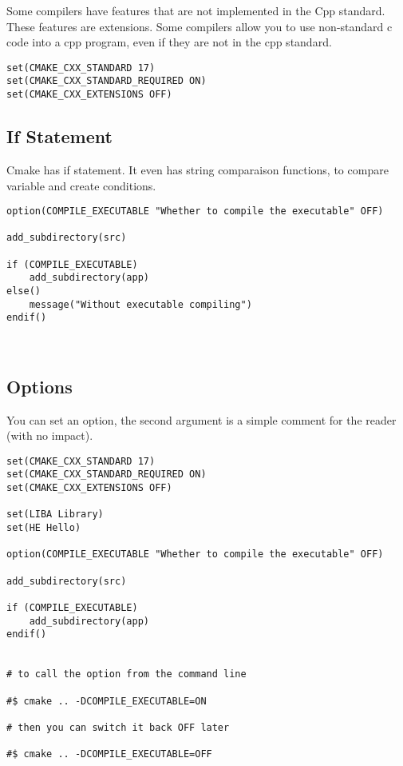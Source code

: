 Some compilers have features that are not implemented in the Cpp standard. These features are extensions.
Some compilers allow you to use non-standard c code into a cpp program, even if they are not in the cpp standard.

\begin{verbatim}
set(CMAKE_CXX_STANDARD 17)
set(CMAKE_CXX_STANDARD_REQUIRED ON)
set(CMAKE_CXX_EXTENSIONS OFF)
\end{verbatim}

\subsection{If Statement}

Cmake has if statement. It even has string comparaison functions, to compare variable and create conditions.

\begin{verbatim}
option(COMPILE_EXECUTABLE "Whether to compile the executable" OFF)

add_subdirectory(src)

if (COMPILE_EXECUTABLE)
    add_subdirectory(app)
else()
    message("Without executable compiling")
endif()



\end{verbatim}


\subsection{Options}

You can set an option, the second argument is a simple comment for the reader (with no impact).

\begin{verbatim}
set(CMAKE_CXX_STANDARD 17)
set(CMAKE_CXX_STANDARD_REQUIRED ON)
set(CMAKE_CXX_EXTENSIONS OFF)

set(LIBA Library)
set(HE Hello)

option(COMPILE_EXECUTABLE "Whether to compile the executable" OFF)

add_subdirectory(src)

if (COMPILE_EXECUTABLE)
    add_subdirectory(app)
endif()


# to call the option from the command line

#$ cmake .. -DCOMPILE_EXECUTABLE=ON

# then you can switch it back OFF later

#$ cmake .. -DCOMPILE_EXECUTABLE=OFF
\end{verbatim}


